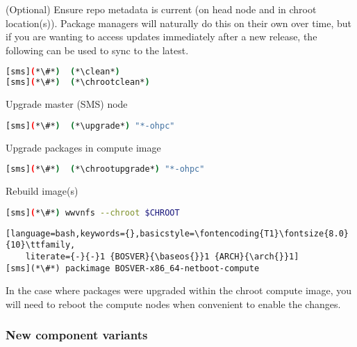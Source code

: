 \begin{enumerate*}
\item (Optional) Ensure repo metadata is current (on head node and in chroot
  location(s)). Package managers will naturally do this on their own over time,
  but if you are wanting to access updates immediately after a new release,
  the following can be used to sync to the latest.

\begin{lstlisting}[language=bash,keywords={}]
[sms](*\#*)  (*\clean*)
[sms](*\#*)  (*\chrootclean*)
\end{lstlisting}

\item Upgrade master (SMS) node

\begin{lstlisting}[language=bash,keywords={}]
[sms](*\#*)  (*\upgrade*) "*-ohpc"
\end{lstlisting}
  
\item Upgrade packages in compute image

\begin{lstlisting}[language=bash,keywords={}]
[sms](*\#*)  (*\chrootupgrade*) "*-ohpc"
\end{lstlisting}
  
\item Rebuild image(s)

\begin{lstlisting}[language=bash,keywords={}]
[sms](*\#*) wwvnfs --chroot $CHROOT
\end{lstlisting}
\fi

\begin{lstlisting}[language=bash,keywords={},basicstyle=\fontencoding{T1}\fontsize{8.0}{10}\ttfamily,
    literate={-}{-}1 {BOSVER}{\baseos{}}1 {ARCH}{\arch{}}1]
[sms](*\#*) packimage BOSVER-x86_64-netboot-compute
\end{lstlisting}
\fi

\end{enumerate*}

\noindent In the case where packages were upgraded within the chroot compute image,
you will need to reboot the compute nodes when convenient to enable the
changes.

\subsubsection{New component variants}

